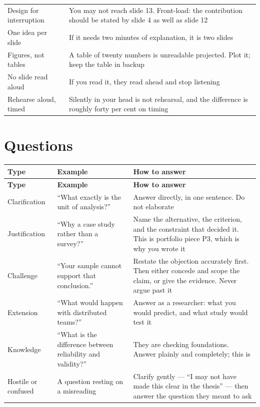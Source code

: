 \begin{center}
\small
\begin{tabular}{@{}L{3.4cm}L{10.9cm}@{}}
\toprule
Design for interruption & You may not reach slide 13. Front-load: the
                          contribution should be stated by slide 4 as well as
                          slide 12 \\
One idea per slide      & If it needs two minutes of explanation, it is two
                          slides \\
Figures, not tables     & A table of twenty numbers is unreadable projected.
                          Plot it; keep the table in backup \\
No slide read aloud     & If you read it, they read ahead and stop listening \\
Rehearse aloud, timed   & Silently in your head is not rehearsal, and the
                          difference is roughly forty per cent on timing \\
\bottomrule
\end{tabular}
\end{center}

\section{Questions}

\begin{center}
\small
\begin{longtable}{@{}L{3.0cm}L{4.8cm}L{6.4cm}@{}}
\toprule
\textbf{Type} & \textbf{Example} & \textbf{How to answer} \\
\midrule
\endfirsthead
\toprule
\textbf{Type} & \textbf{Example} & \textbf{How to answer} \\
\midrule
\endhead
\bottomrule
\endfoot
Clarification
  & ``What exactly is the unit of analysis?''
  & Answer directly, in one sentence. Do not elaborate \\
Justification
  & ``Why a case study rather than a survey?''
  & Name the alternative, the criterion, and the constraint that decided it.
    This is portfolio piece P3, which is why you wrote it \\
Challenge
  & ``Your sample cannot support that conclusion.''
  & Restate the objection accurately first. Then either concede and scope the
    claim, or give the evidence. Never argue past it \\
Extension
  & ``What would happen with distributed teams?''
  & Answer as a researcher: what you would predict, and what study would test
    it \\
Knowledge
  & ``What is the difference between reliability and validity?''
  & They are checking foundations. Answer plainly and completely; this is
     \\
Hostile or confused
  & A question resting on a misreading
  & Clarify gently --- ``I may not have made this clear in the thesis'' --- then
    answer the question they meant to ask \\
\end{longtable}
\end{center}

